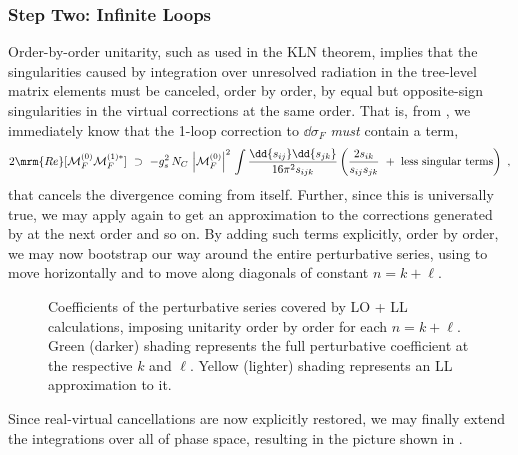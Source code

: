 \subsubsection{Step Two: Infinite Loops}

%
%
Order-by-order unitarity, such as used in the KLN theorem, implies
that the singularities caused by integration over unresolved radiation
in the tree-level matrix elements must be canceled, order by order, by
equal but opposite-sign singularities in the virtual corrections at
the same order. That is, from , we immediately 
know that the 1-loop correction to $\dd{\sigma_F}$ \emph{must} contain a
term, 
\begin{equation}
2\mrm{Re}[{\cal M}_F^{(0)}{\cal M}_F^{(1)*}] \ \supset \ 
- g_s^2 \, N_C \, \left\vert {\cal M}_F^{(0)} \right\vert^2
\, 
\int 
\frac{\dd{s_{ij}}\dd{s_{jk}}}{16\pi^2 s_{ijk}} \left( 
\frac{2s_{ik}}{s_{ij}s_{jk}}~+~\mbox{less singular
  terms}\right)~,\label{eq:eikonalv}
\end{equation}
that cancels the divergence coming from 
itself. Further, since this is universally true, we may apply
 again to get an approximation to the 
corrections generated by  at the next order and so
on. By adding such terms explicitly, order by order, we may now
bootstrap our way around the entire perturbative series, using
 to move horizontally and  to
move along diagonals of constant $n=k+\ell$. 
\begin{figure}
\centering
{}
\caption{Coefficients of the perturbative series covered by LO + LL 
  calculations, imposing unitarity order by order for each $n =
  k+\ell$. Green (darker) shading represents the full perturbative
  coefficient at the respective $k$ and $\ell$. Yellow (lighter)
  shading represents an LL approximation to it. 
\label{fig:LLu}}
\end{figure}
Since real-virtual cancellations are now explicitly restored, we may
finally extend the integrations over all of phase space, resulting in
the picture shown in \figRef{fig:LLu}. 

